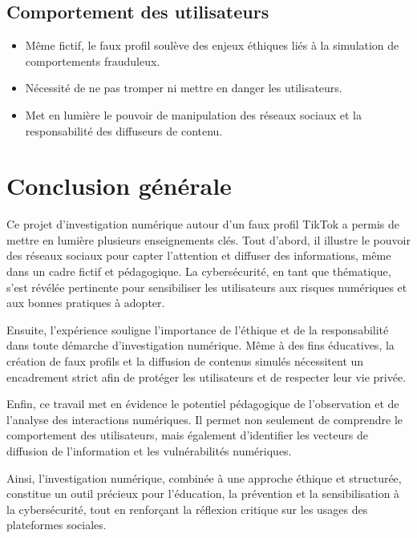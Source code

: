 \documentclass[12pt]{article}
\begin{document}
\begin{center}
\subsection{ Comportement des utilisateurs}
\begin{itemize}[leftmargin=*, label=\textbullet]
    \item Même fictif, le faux profil soulève des enjeux éthiques liés à la simulation de comportements frauduleux.  
    \item Nécessité de ne pas tromper ni mettre en danger les utilisateurs.  
    \item Met en lumière le pouvoir de manipulation des réseaux sociaux et la responsabilité des diffuseurs de contenu.
\end{itemize}

\section*{Conclusion générale}

Ce projet d’investigation numérique autour d’un faux profil TikTok a permis de mettre en lumière plusieurs enseignements clés.  
Tout d’abord, il illustre le pouvoir des réseaux sociaux pour capter l’attention et diffuser des informations, même dans un cadre fictif et pédagogique. La cybersécurité, en tant que thématique, s’est révélée pertinente pour sensibiliser les utilisateurs aux risques numériques et aux bonnes pratiques à adopter.  

Ensuite, l’expérience souligne l’importance de l’éthique et de la responsabilité dans toute démarche d’investigation numérique. Même à des fins éducatives, la création de faux profils et la diffusion de contenus simulés nécessitent un encadrement strict afin de protéger les utilisateurs et de respecter leur vie privée.  

Enfin, ce travail met en évidence le potentiel pédagogique de l’observation et de l’analyse des interactions numériques. Il permet non seulement de comprendre le comportement des utilisateurs, mais également d’identifier les vecteurs de diffusion de l’information et les vulnérabilités numériques.  

Ainsi, l’investigation numérique, combinée à une approche éthique et structurée, constitue un outil précieux pour l’éducation, la prévention et la sensibilisation à la cybersécurité, tout en renforçant la réflexion critique sur les usages des plateformes sociales.
\end{center}
\end{document}
